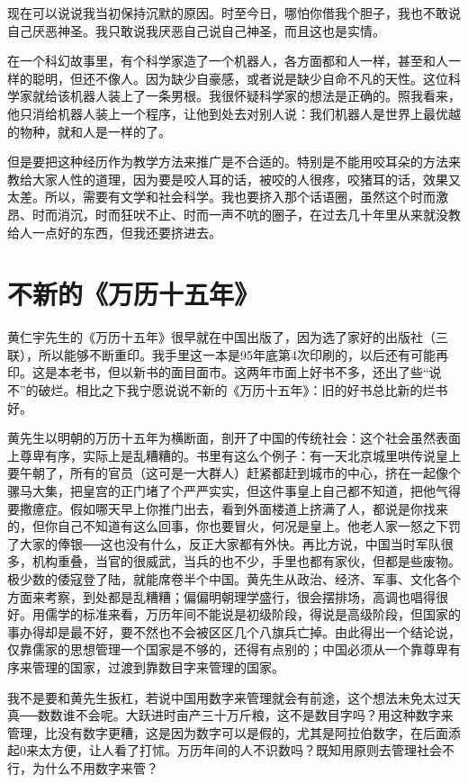 现在可以说说我当初保持沉默的原因。时至今日，哪怕你借我个胆子，我也不敢说自己厌恶神圣。我只敢说我厌恶自己说自己神圣，而且这也是实情。 

在一个科幻故事里，有个科学家造了一个机器人，各方面都和人一样，甚至和人一样的聪明，但还不像人。因为缺少自豪感，或者说是缺少自命不凡的天性。这位科学家就给该机器人装上了一条男根。我很怀疑科学家的想法是正确的。照我看来，他只消给机器人装上一个程序，让他到处去对别人说：我们机器人是世界上最优越的物种，就和人是一样的了。 

但是要把这种经历作为教学方法来推广是不合适的。特别是不能用咬耳朵的方法来教给大家人性的道理，因为要是咬人耳的话，被咬的人很疼，咬猪耳的话，效果又太差。所以，需要有文学和社会科学。我也要挤入那个话语圈，虽然这个时而激昂、时而消沉，时而狂吠不止、时而一声不吭的圈子，在过去几十年里从来就没教给人一点好的东西，但我还要挤进去。

\chapter{不新的《万历十五年》}

黄仁宇先生的《万历十五年》很早就在中国出版了，因为选了家好的出版社（三联），所以能够不断重印。我手里这一本是95年底第4次印刷的，以后还有可能再印。这是本老书，但以新书的面目面市。这两年市面上好书不多，还出了些“说不”的破烂。相比之下我宁愿说说不新的《万历十五年》：旧的好书总比新的烂书好。 

黄先生以明朝的万历十五年为横断面，剖开了中国的传统社会：这个社会虽然表面上尊卑有序，实际上是乱糟糟的。书里有这么个例子：有一天北京城里哄传说皇上要午朝了，所有的官员（这可是一大群人）赶紧都赶到城市的中心，挤在一起像个骡马大集，把皇宫的正门堵了个严严实实，但这件事皇上自己都不知道，把他气得要撒癔症。假如哪天早上你推门出去，看到外面楼道上挤满了人，都说是你找来的，但你自己不知道有这么回事，你也要冒火，何况是皇上。他老人家一怒之下罚了大家的俸银──这也没有什么，反正大家都有外快。再比方说，中国当时军队很多，机构重叠，当官的很威武，当兵的也不少，手里也都有家伙，但都是些废物。极少数的倭寇登了陆，就能席卷半个中国。黄先生从政治、经济、军事、文化各个方面来考察，到处都是乱糟糟；偏偏明朝理学盛行，很会摆排场，高调也唱得很好。用儒学的标准来看，万历年间不能说是初级阶段，得说是高级阶段，但国家的事办得却是最不好，要不然也不会被区区几个八旗兵亡掉。由此得出一个结论说，仅靠儒家的思想管理一个国家是不够的，还得有点别的；中国必须从一个靠尊卑有序来管理的国家，过渡到靠数目字来管理的国家。 

我不是要和黄先生扳杠，若说中国用数字来管理就会有前途，这个想法未免太过天真──数数谁不会呢。大跃进时亩产三十万斤粮，这不是数目字吗？用这种数字来管理，比没有数字更糟，这是因为数字可以是假的，尤其是阿拉伯数字，在后面添起0来太方便，让人看了打怵。万历年间的人不识数吗？既知用原则去管理社会不行，为什么不用数字来管？ 

